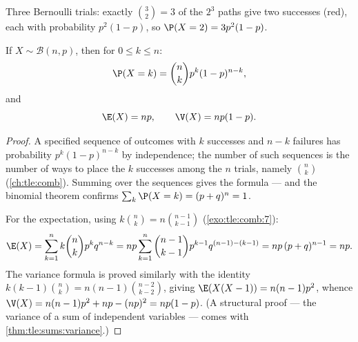 \begin{omfigure}

{\small Three Bernoulli trials: exactly $\binom{3}{2} = 3$ of the
$2^3$ paths give two successes (red), each with probability $p^2(1-p)$,
so $\P(X = 2) = 3p^2(1-p)$.}
\end{omfigure}

\begin{theorem}\label{thm:tle:randvar:binomial}
If $X \sim \mathcal B(n, p)$, then for $0 \leq k \leq n$:
\[
\P(X = k) = \binom{n}{k} p^k (1-p)^{n-k},
\]
and
\[
\E(X) = np, \qquad \V(X) = np(1-p) .
\]
\end{theorem}

\begin{proof}
A specified sequence of outcomes with $k$ successes and $n-k$ failures has
probability $p^k(1-p)^{n-k}$ by independence; the number of such sequences
is the number of ways to place the $k$ successes among the $n$ trials,
namely $\binom nk$ (\cref{ch:tle:comb}). Summing over the sequences gives
the formula --- and the binomial theorem confirms
$\sum_k \P(X = k) = (p + q)^n = 1$.

For the expectation, using $k\binom nk = n\binom{n-1}{k-1}$
(\cref{exo:tle:comb:7}):
\[
\E(X) = \sum_{k=1}^{n} k\binom nk p^k q^{n-k}
= np\sum_{k=1}^{n} \binom{n-1}{k-1} p^{k-1} q^{(n-1)-(k-1)}
= np\,(p + q)^{n-1} = np .
\]
The variance formula is proved similarly with the identity
$k(k-1)\binom nk = n(n-1)\binom{n-2}{k-2}$, giving
$\E(X(X-1)) = n(n-1)p^2$, whence
$\V(X) = n(n-1)p^2 + np - (np)^2 = np(1-p)$. (A structural proof --- the
variance of a sum of independent variables --- comes with
\cref{thm:tle:sums:variance}.)
\end{proof}

